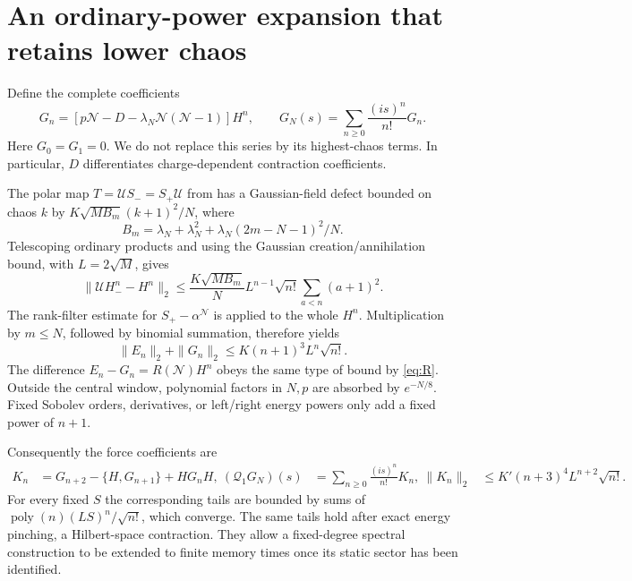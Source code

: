 \documentclass[11pt]{article}
\newcommand{\NN}{\mathcal N}
\newcommand{\QQ}{\mathcal Q}
\begin{document}
\newpage
\section{An ordinary-power expansion that retains lower chaos}
Define the complete coefficients
\begin{equation}
 G_n=[p\NN-D-\lambda_N\NN(\NN-1)]H^n,\qquad
 G_N(s)=\sum_{n\ge0}\frac{(is)^n}{n!}G_n.\label{eq:rawseries}
\end{equation}
Here $G_0=G_1=0$. We do not replace this series by its highest-chaos
terms. In particular, $D$ differentiates charge-dependent contraction
coefficients.

The polar map $T=\mathcal U S_-=S_+\mathcal U$ from \cite{Transfer}
has a Gaussian-field defect bounded on chaos $k$ by
$K\sqrt{MB_m}(k+1)^2/N$, where
\begin{equation}
 B_m=\lambda_N+\lambda_N^2+
        \lambda_N(2m-N-1)^2/N.
\end{equation}
Telescoping ordinary products and using the Gaussian creation/annihilation
bound, with $L=2\sqrt M$, gives
\begin{equation}
 \|\mathcal U H_-^n-H^n\|_2
 \le\frac{K\sqrt{MB_m}}N L^{n-1}\sqrt{n!}
       \sum_{a<n}(a+1)^2.\label{eq:polar}
\end{equation}
The rank-filter estimate for $S_+-\alpha^{\NN}$ is applied to the
whole $H^n$. Multiplication by $m\le N$, followed by binomial summation,
therefore yields
\begin{equation}
 \|E_n\|_2+\|G_n\|_2\le K(n+1)^3L^n\sqrt{n!}.\label{eq:tail}
\end{equation}
The difference $E_n-G_n=R(\NN)H^n$ obeys the same type of bound by
\eqref{eq:R}. Outside the central window, polynomial factors in $N,p$
are absorbed by $e^{-N/8}$. Fixed Sobolev orders, derivatives, or
left/right energy powers only add a fixed power of $n+1$.

Consequently the force coefficients are
\begin{align}
 K_n&=G_{n+2}-\{H,G_{n+1}\}+HG_nH,\
 (\QQ_1G_N)(s)&=\sum_{n\ge0}\frac{(is)^n}{n!}K_n,\
 \|K_n\|_2&\le K'(n+3)^4L^{n+2}\sqrt{n!}.\label{eq:forcetail}
\end{align}
For every fixed $S$ the corresponding tails are bounded by sums of
$\operatorname{poly}(n)(LS)^n/\sqrt{n!}$, which converge. The same
tails hold after exact energy pinching, a Hilbert-space contraction.
They allow a fixed-degree spectral construction to be extended to
finite memory times once its static sector has been identified.
\end{document}
